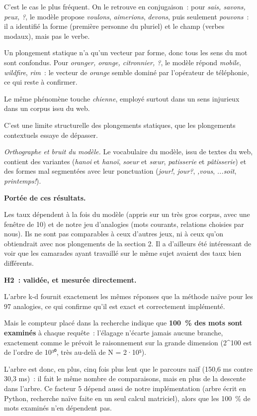 \documentclass[11pt,a4paper]{article}
\begin{document}
C’est le cas le plus fréquent. On le retrouve en conjugaison~: pour \emph{sais, savons, peux, ?}, le modèle propose \emph{voulons}, \emph{aimerions}, \emph{devons}, puis seulement \emph{pouvons}~: il a identifié la forme (première personne du pluriel) et le champ (verbes modaux), mais pas le verbe.

Un plongement statique n’a qu’un vecteur par forme, donc tous les sens du mot sont confondus. Pour \emph{oranger, orange, citronnier, ?}, le modèle répond \emph{mobile}, \emph{wildfire}, \emph{rim}~: le vecteur de \emph{orange} semble dominé par l’opérateur de téléphonie, ce qui reste à confirmer.

Le même phénomène touche \emph{chienne}, employé surtout dans un sens injurieux dans un corpus issu du web.

C’est une limite structurelle des plongements statiques, que les plongements contextuels essaye de dépasser.

\emph{Orthographe et bruit du modèle.} Le vocabulaire du modèle, issu de textes du web, contient des variantes (\emph{hanoi} et \emph{hanoï}, \emph{soeur} et \emph{sœur}, \emph{patisserie} et \emph{pâtisserie}) et des formes mal segmentées avec leur ponctuation (\emph{jour!}, \emph{jour?}, \emph{,vous}, \emph{...soit}, \emph{printemps!}). 

\textbf{Portée de ces résultats.}\nopagebreak

Les taux dépendent à la fois du modèle (appris sur un très gros corpus, avec une fenêtre de 10) et de notre jeu d’analogies (mots courants, relations choisies par nous). Ils ne sont pas comparables à ceux d’autres jeux, ni à ceux qu’on obtiendrait avec nos plongements de la section 2. Il a d’ailleurs été intéressant de voir que les camarades ayant travaillé sur le même sujet avaient des taux bien différents.

\textbf{H2~: validée, et mesurée directement.}\nopagebreak

L’arbre k-d fournit exactement les mêmes réponses que la méthode naïve pour les 97 analogies, ce qui confirme qu’il est exact et correctement implémenté.

Mais le compteur placé dans la recherche indique que \textbf{100~\% des mots sont examinés} à chaque requête~: l’élagage n’écarte jamais aucune branche, exactement comme le prévoit le raisonnement sur la grande dimension (2\textasciicircum{}100 est de l’ordre de 10³⁰, très au-delà de N = 2·10⁵).

L’arbre est donc, en plus, cinq fois plus lent que le parcours naïf (150,6 ms contre 30,3 ms)~: il fait le même nombre de comparaisons, mais en plus de la descente dans l’arbre. Ce facteur 5 dépend aussi de notre implémentation (arbre écrit en Python, recherche naïve faite en un seul calcul matriciel), alors que les 100~\% de mots examinés n’en dépendent pas.
\end{document}
